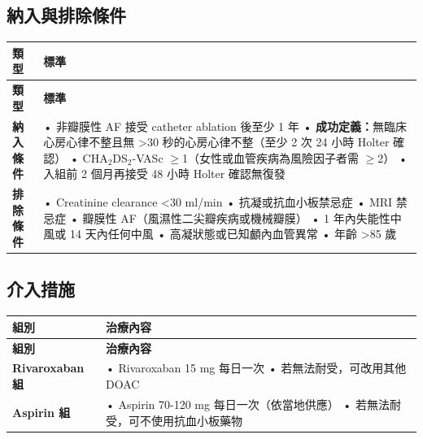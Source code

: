 \documentclass[12pt,a4paper]{article}
\begin{document}
\subsection{納入與排除條件}

\begin{longtable}{p{3cm}p{11cm}}
\toprule
\textbf{類型} & \textbf{標準} \\
\midrule
\endfirsthead
\toprule
\textbf{類型} & \textbf{標準} \\
\midrule
\endhead
\bottomrule
\endfoot

\textbf{納入條件} &
• 非瓣膜性 AF 接受 catheter ablation 後至少 1 年\newline
• \textbf{成功定義：}無臨床心房心律不整且無 >30 秒的心房心律不整（至少 2 次 24 小時 Holter 確認）\newline
• CHA$_2$DS$_2$-VASc $\geq$1（女性或血管疾病為風險因子者需 $\geq$2）\newline
• 入組前 2 個月再接受 48 小時 Holter 確認無復發 \\
\midrule

\textbf{排除條件} &
• Creatinine clearance <30 ml/min\newline
• 抗凝或抗血小板禁忌症\newline
• MRI 禁忌症\newline
• 瓣膜性 AF（風濕性二尖瓣疾病或機械瓣膜）\newline
• 1 年內失能性中風或 14 天內任何中風\newline
• 高凝狀態或已知顱內血管異常\newline
• 年齡 >85 歲 \\
\bottomrule
\end{longtable}

\subsection{介入措施}

\begin{longtable}{p{4cm}p{10cm}}
\toprule
\textbf{組別} & \textbf{治療內容} \\
\midrule
\endfirsthead
\toprule
\textbf{組別} & \textbf{治療內容} \\
\midrule
\endhead
\bottomrule
\endfoot

\textbf{Rivaroxaban 組} &
• Rivaroxaban 15 mg 每日一次\newline
• 若無法耐受，可改用其他 DOAC \\
\midrule

\textbf{Aspirin 組} &
• Aspirin 70-120 mg 每日一次（依當地供應）\newline
• 若無法耐受，可不使用抗血小板藥物 \\
\bottomrule
\end{longtable}
\end{document}
